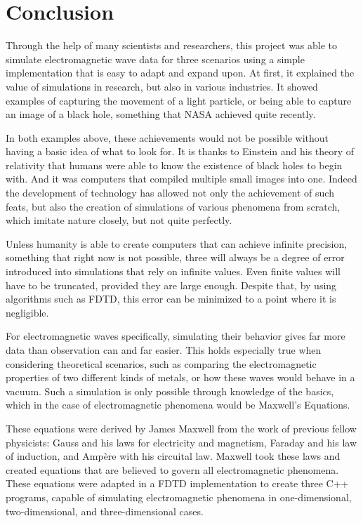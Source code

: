 
\chapter{Conclusion} %

\label{Chapter5} %

Through the help of many scientists and researchers, this project was able to simulate electromagnetic wave data for three scenarios using a simple implementation that is easy to adapt and expand upon. At first, it explained the value of simulations in research, but also in various industries. It showed examples of capturing the movement of a light particle\textsuperscript{\cite{velten2013femto}}, or being able to capture an image of a black hole\textsuperscript{\cite{landau_2019}}, something that NASA achieved quite recently.

In both examples above, these achievements would not be possible without having a basic idea of what to look for. It is thanks to Einstein and his theory of relativity that humans were able to know the existence of black holes to begin with\textsuperscript{\cite{Eling_2010}}. And it was computers that compiled multiple small images into one. Indeed the development of technology has allowed not only the achievement of such feats, but also the creation of simulations of various phenomena from scratch, which imitate nature closely, but not quite perfectly.

Unless humanity is able to create computers that can achieve infinite precision, something that right now is not possible, three will always be a degree of error introduced into simulations that rely on infinite values. Even finite values will have to be truncated, provided they are large enough. Despite that, by using algorithms such as FDTD, this error can be minimized to a point where it is negligible. 

For electromagnetic waves specifically, simulating their behavior gives far more data than observation can and far easier. This holds especially true when considering theoretical scenarios, such as comparing the electromagnetic properties of two different kinds of metals, or how these waves would behave in a vacuum. Such a simulation is only possible through knowledge of the basics, which in the case of electromagnetic phenomena would be Maxwell's Equations.

These equations were derived by James Maxwell from the work of previous fellow physicists: Gauss and his laws for electricity and magnetism, Faraday and his law of induction, and Ampère with his circuital law. Maxwell took these laws and created equations that are believed to govern all electromagnetic phenomena. These equations  were adapted in a FDTD implementation to create three C++ programs, capable of simulating electromagnetic phenomena in one-dimensional, two-dimensional, and three-dimensional cases.

